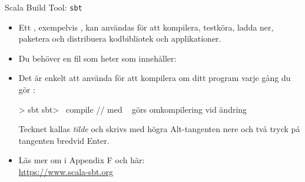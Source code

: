 
\begin{Slide}{Scala Build Tool: \texttt{sbt}}
\begin{itemize}
  \item Ett , exempelvis , kan användas för att kompilera, testköra, ladda ner, paketera och distribuera kodbibliotek och applikationer.
  \item Du behöver en fil som heter  som innehåller:\\
  \item Det är enkelt att använda  för att kompilera om ditt program varje gång du gör :
\begin{REPLnonum}
> sbt
sbt> ~compile   // med ~ görs omkompilering vid ändring
\end{REPLnonum}
Tecknet \code{~} kallas \emph{tilde} och skrivs med högra Alt-tangenten nere och två tryck på tangenten bredvid Enter.

  \item Läs mer om  i Appendix F och här: \\\url{https://www.scala-sbt.org}

\end{itemize}

\end{Slide}


